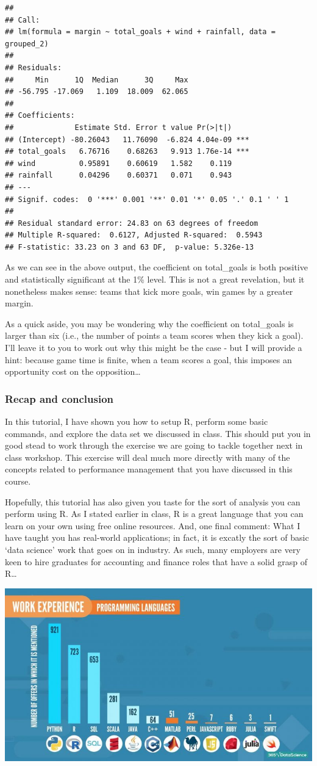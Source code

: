 \documentclass[
]{article}
\begin{document}
\begin{verbatim}
## 
## Call:
## lm(formula = margin ~ total_goals + wind + rainfall, data = grouped_2)
## 
## Residuals:
##     Min      1Q  Median      3Q     Max 
## -56.795 -17.069   1.109  18.009  62.065 
## 
## Coefficients:
##              Estimate Std. Error t value Pr(>|t|)    
## (Intercept) -80.26043   11.76090  -6.824 4.04e-09 ***
## total_goals   6.76716    0.68263   9.913 1.76e-14 ***
## wind          0.95891    0.60619   1.582    0.119    
## rainfall      0.04296    0.60371   0.071    0.943    
## ---
## Signif. codes:  0 '***' 0.001 '**' 0.01 '*' 0.05 '.' 0.1 ' ' 1
## 
## Residual standard error: 24.83 on 63 degrees of freedom
## Multiple R-squared:  0.6127, Adjusted R-squared:  0.5943 
## F-statistic: 33.23 on 3 and 63 DF,  p-value: 5.326e-13
\end{verbatim}

As we can see in the above output, the coefficient on total\_goals is
both positive and statistically significant at the 1\% level. This is
not a great revelation, but it nonetheless makes sense: teams that kick
more goals, win games by a greater margin.

As a quick aside, you may be wondering why the coefficient on
total\_goals is larger than six (i.e., the number of points a team
scores when they kick a goal). I'll leave it to you to work out why this
might be the case - but I will provide a hint: because game time is
finite, when a team scores a goal, this imposes an opportunity cost on
the opposition\ldots{}

\hypertarget{recap-and-conclusion}{%
\subsubsection{Recap and conclusion}\label{recap-and-conclusion}}

In this tutorial, I have shown you how to setup R, perform some basic
commands, and explore the data set we discussed in class. This should
put you in good stead to work through the exercise we are going to
tackle together next in class workshop. This exercise will deal much
more directly with many of the concepts related to performance
management that you have discussed in this course.

Hopefully, this tutorial has also given you taste for the sort of
analysis you can perform using R. As I stated earlier in class, R is a
great language that you can learn on your own using free online
resources. And, one final comment: What I have taught you has real-world
applications; in fact, it is excatly the sort of basic `data science'
work that goes on in industry. As such, many employers are very keen to
hire graduates for accounting and finance roles that have a solid grasp
of R\ldots{}

\includegraphics{Images/data_science_jobs.jpg}
\end{document}
